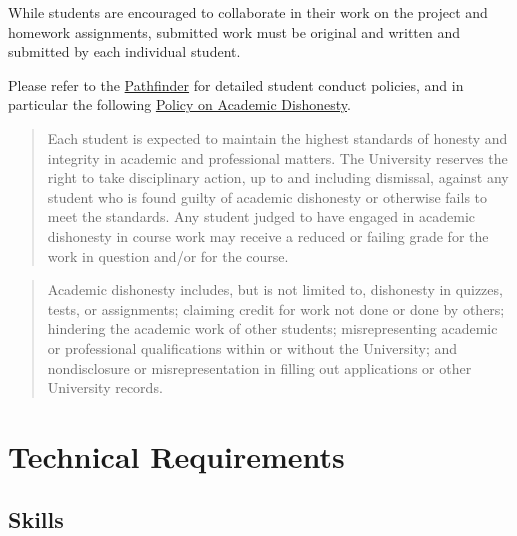 \documentclass[
]{article}
\begin{document}
While students are encouraged to collaborate in their work on the
project and homework assignments, submitted work must be original and
written and submitted by each individual student.

Please refer to the \href{http://pathfinder.unm.edu/}{Pathfinder} for
detailed student conduct policies, and in particular the following
\href{http://pathfinder.unm.edu/campus-policies/academic-dishonesty.html}{Policy
on Academic Dishonesty}.

\begin{quote}
Each student is expected to maintain the highest standards of honesty
and integrity in academic and professional matters. The University
reserves the right to take disciplinary action, up to and including
dismissal, against any student who is found guilty of academic
dishonesty or otherwise fails to meet the standards. Any student judged
to have engaged in academic dishonesty in course work may receive a
reduced or failing grade for the work in question and/or for the course.
\end{quote}

\begin{quote}
Academic dishonesty includes, but is not limited to, dishonesty in
quizzes, tests, or assignments; claiming credit for work not done or
done by others; hindering the academic work of other students;
misrepresenting academic or professional qualifications within or
without the University; and nondisclosure or misrepresentation in
filling out applications or other University records.
\end{quote}

\hypertarget{technical-requirements}{%
\section{Technical Requirements}\label{technical-requirements}}

\hypertarget{skills}{%
\subsection{Skills}\label{skills}}
\end{document}
